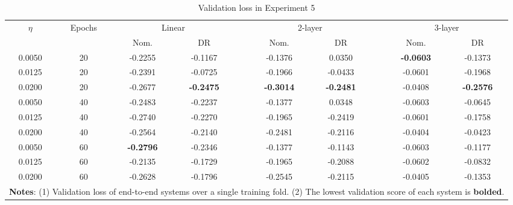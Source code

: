 \documentclass[10pt, twocolumn]{article}
\theoremstyle{plain}
\theoremstyle{definition}
\begin{document}
\begin{appendices}
\begin{table}[!ht]
\caption{Validation loss in Experiment 5}
\centering
\begin{tabular}{ccccr@{}ccr@{}cc}
\toprule
$\eta$ &  Epochs & \multicolumn{2}{c}{Linear} && \multicolumn{2}{c}{2-layer} && \multicolumn{2}{c}{3-layer}\\[0.5ex]\cline{3-4} \cline{6-7} \cline{9-10}
\rule{0pt}{3ex}&& Nom. & DR && Nom. & DR && Nom. & DR\\
\midrule
0.0050 & 20 & -0.2255 & -0.1167 && -0.1376 &  0.0350 && \textbf{-0.0603} & -0.1373 \\
0.0125 & 20 & -0.2391 & -0.0725 && -0.1966 & -0.0433 && -0.0601 & -0.1968 \\
0.0200 & 20 & -0.2677 & \textbf{-0.2475} && \textbf{-0.3014} & \textbf{-0.2481} && -0.0408 & \textbf{-0.2576} \\
\midrule
0.0050 & 40 & -0.2483 & -0.2237 && -0.1377 &  0.0348 && -0.0603 & -0.0645 \\
0.0125 & 40 & -0.2740 & -0.2270 && -0.1965 & -0.2419 && -0.0601 & -0.1758 \\
0.0200 & 40 & -0.2564 & -0.2140 && -0.2481 & -0.2116 && -0.0404 & -0.0423 \\
\midrule
0.0050 & 60 & \textbf{-0.2796} & -0.2346 && -0.1377 & -0.1143 && -0.0603 & -0.1177 \\
0.0125 & 60 & -0.2135 & -0.1729 && -0.1965 & -0.2088 && -0.0602 & -0.0832 \\
0.0200 & 60 & -0.2628 & -0.1796 && -0.2545 & -0.2115 && -0.0405 & -0.1353 \\
\bottomrule
\multicolumn{10}{p{0.7\linewidth}}{\small\rule{0pt}{3ex}\textbf{Notes}: (1) Validation loss of end-to-end systems over a single training fold. (2) The lowest validation score of each system is \textbf{bolded}.}\\
\end{tabular}
\label{table:exp5_val}
\end{table}

\end{appendices}

\end{document}
